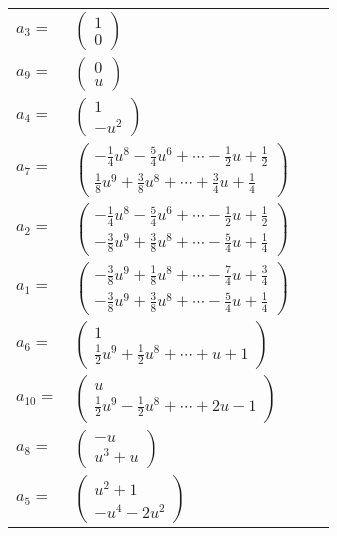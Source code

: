 \documentclass[1p]{elsarticle_modified}
\theoremstyle{definition}
\begin{document}
\begin{tabular}{m{7pt} m{180pt} m{7pt} m{180pt} }
\flushright $a_{3}=$&$\begin{pmatrix}1\\0\end{pmatrix}$ \\
\flushright $a_{9}=$&$\begin{pmatrix}0\\u\end{pmatrix}$ \\
\flushright $a_{4}=$&$\begin{pmatrix}1\\- u^2\end{pmatrix}$ \\
\flushright $a_{7}=$&$\begin{pmatrix}-\frac{1}{4} u^8-\frac{5}{4} u^6+\cdots-\frac{1}{2} u+\frac{1}{2}\\\frac{1}{8} u^9+\frac{3}{8} u^8+\cdots+\frac{3}{4} u+\frac{1}{4}\end{pmatrix}$ \\
\flushright $a_{2}=$&$\begin{pmatrix}-\frac{1}{4} u^8-\frac{5}{4} u^6+\cdots-\frac{1}{2} u+\frac{1}{2}\\-\frac{3}{8} u^9+\frac{3}{8} u^8+\cdots-\frac{5}{4} u+\frac{1}{4}\end{pmatrix}$ \\
\flushright $a_{1}=$&$\begin{pmatrix}-\frac{3}{8} u^9+\frac{1}{8} u^8+\cdots-\frac{7}{4} u+\frac{3}{4}\\-\frac{3}{8} u^9+\frac{3}{8} u^8+\cdots-\frac{5}{4} u+\frac{1}{4}\end{pmatrix}$ \\
\flushright $a_{6}=$&$\begin{pmatrix}1\\\frac{1}{2} u^9+\frac{1}{2} u^8+\cdots+u+1\end{pmatrix}$ \\
\flushright $a_{10}=$&$\begin{pmatrix}u\\\frac{1}{2} u^9-\frac{1}{2} u^8+\cdots+2 u-1\end{pmatrix}$ \\
\flushright $a_{8}=$&$\begin{pmatrix}- u\\u^3+u\end{pmatrix}$ \\
\flushright $a_{5}=$&$\begin{pmatrix}u^2+1\\- u^4-2 u^2\end{pmatrix}$ \\

\end{tabular}
\end{document}
